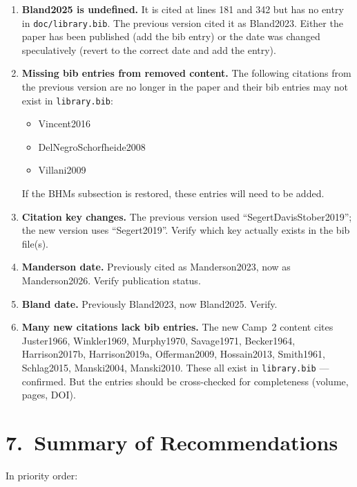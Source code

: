 \documentclass[12pt,a4paper]{article}
\begin{document}
\begin{enumerate}[leftmargin=1.5em]
  \item \textbf{Bland2025 is undefined.} It is cited at lines 181 and 342 but
    has no entry in \texttt{doc/library.bib}. The previous version cited it
    as Bland2023. Either the paper has been published (add the bib entry) or
    the date was changed speculatively (revert to the correct date and add the
    entry).

  \item \textbf{Missing bib entries from removed content.} The following
    citations from the previous version are no longer in the paper and their
    bib entries may not exist in \texttt{library.bib}:
    \begin{itemize}
      \item Vincent2016
      \item DelNegroSchorfheide2008
      \item Villani2009
    \end{itemize}
    If the BHMs subsection is restored, these entries will need to be added.

  \item \textbf{Citation key changes.} The previous version used
    ``SegertDavisStober2019''; the new version uses ``Segert2019''. Verify
    which key actually exists in the bib file(s).

  \item \textbf{Manderson date.} Previously cited as Manderson2023, now as
    Manderson2026. Verify publication status.

  \item \textbf{Bland date.} Previously Bland2023, now Bland2025. Verify.

  \item \textbf{Many new citations lack bib entries.} The new Camp~2 content
    cites Juster1966, Winkler1969, Murphy1970, Savage1971, Becker1964,
    Harrison2017b, Harrison2019a, Offerman2009, Hossain2013, Smith1961,
    Schlag2015, Manski2004, Manski2010. These all exist in
    \texttt{library.bib} --- confirmed. But the entries should be
    cross-checked for completeness (volume, pages, DOI).
\end{enumerate}


\section{7.\ Summary of Recommendations}

In priority order:
\end{document}
